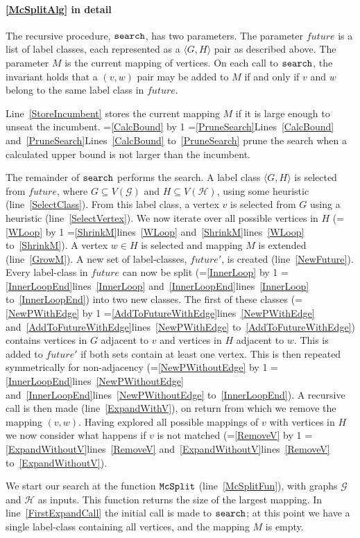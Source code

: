 \documentclass[letterpaper]{article}
\newcommand{\AlgVar}[1]{\mathit{#1}}
\newcommand{\graphG}{\mathcal{G}}
\newcommand{\graphH}{\mathcal{H}}
\newcommand{\setG}{G}
\newcommand{\setH}{H}
\newcommand{\lineref}[1]{line~\ref{#1}}
\newcommand{\linerangeref}[2]{\count255=\ref{#1}\advance\count255 by 1 \ifnum\count255=\ref{#2}lines~\ref{#1} and~\ref{#2}\else lines~\ref{#1} to~\ref{#2}\fi}
\newcommand{\Lineref}[1]{Line~\ref{#1}}
\newcommand{\Linerangeref}[2]{\count255=\ref{#1}\advance\count255 by 1 \ifnum\count255=\ref{#2}Lines~\ref{#1} and~\ref{#2}\else Lines~\ref{#1} to~\ref{#2}\fi}
\begin{document}
\paragraph{\cref{McSplitAlg} in detail} The recursive procedure,
$\FuncSty{search}$, has two parameters.  The parameter $\AlgVar{future}$ is a
list of label classes, each represented as a $\langle \setG, \setH \rangle$ pair as
described above.  The parameter $M$ is the current mapping of vertices.  On
each call to $\FuncSty{search}$, the invariant holds that a $(v,w)$ pair may be
added to $M$ if and only if $v$ and $w$ belong to the same label class in
$\AlgVar{future}$.

\Lineref{StoreIncumbent} stores the current mapping $M$ if it is large enough
to unseat the incumbent.  \Linerangeref{CalcBound}{PruneSearch} prune the
search when a calculated upper bound is not larger than the incumbent.

The remainder of $\FuncSty{search}$ performs the search.  A label class
$\langle \setG, \setH \rangle$ is selected from $\AlgVar{future}$, where $\setG \subseteq
V(\graphG)$ and $\setH \subseteq V(\graphH)$, using some heuristic (\lineref{SelectClass}).
From this label class, a vertex $v$ is selected from $\setG$ using a heuristic
(\lineref{SelectVertex}). We now iterate over all possible vertices in $\setH$
(\linerangeref{WLoop}{ShrinkM}). A vertex $w \in \setH$ is selected and mapping $M$
is extended (\lineref{GrowM}). A new set of label-classes, $\AlgVar{future'}$,
is created (\lineref{NewFuture}).  Every label-class in $\AlgVar{future}$ can
now be split (\linerangeref{InnerLoop}{InnerLoopEnd}) into two new classes. The
first of these classes (\linerangeref{NewPWithEdge}{AddToFutureWithEdge})
contains vertices in $\setG$ adjacent to $v$ and vertices in $\setH$ adjacent to $w$.
This is added to $\AlgVar{future'}$ if both sets contain at least one vertex.
This is then repeated symmetrically for non-adjacency
(\linerangeref{NewPWithoutEdge}{InnerLoopEnd}). A recursive call is then made
(\lineref{ExpandWithV}), on return from which we remove the mapping $(v,w)$.
Having explored all possible mappings of $v$ with vertices in $\setH$ we now
consider what happens if $v$ is not matched
(\linerangeref{RemoveV}{ExpandWithoutV}).

We start our search at the function $\FuncSty{McSplit}$ (\lineref{McSplitFun}),
with graphs $\graphG$ and $\graphH$ as inputs.  This function returns the size of the
largest mapping.  In \lineref{FirstExpandCall} the initial call is made to
$\FuncSty{search}$; at this point we have a single label-class containing all
vertices, and the mapping $M$ is empty.
\end{document}
